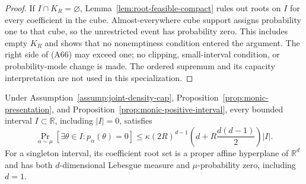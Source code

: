 \begin{proof}
If $I\cap K_R=\varnothing$, Lemma~\ref{lem:root-feasible-compact} rules out
roots on $I$ for every coefficient in the cube.  Almost-everywhere cube
support assigns probability one to that cube, so the unrestricted event has
probability zero.  This includes empty $K_R$ and shows that no nonemptiness
condition entered the argument.  The right side of \textup{(A66)} may
exceed one; no clipping, small-interval condition, or probability-mode
change is made.  The ordered supremum and its capacity interpretation are
not used in this specialization.
\end{proof}

\begin{proposition}
\label{prop:complete-monic-baseline}
Under Assumption~\ref{assump:joint-density-cap},
Proposition~\ref{prop:monic-presentation}, and
Proposition~\ref{prop:monic-positive-interval}, every bounded interval
$I\subset\mathbb R$, including $|I|=0$, satisfies
\[
\Pr_{\alpha\sim\mu}\!\left[\exists\theta\in I:p_\alpha(\theta)=0\right]
\leq\kappa(2R)^{d-1}
\left(d+R\frac{d(d-1)}2\right)|I|.
\tag{A68}
\]
For a singleton interval, its coefficient root set is a proper affine
hyperplane of $\mathbb R^d$ and has both $d$-dimensional Lebesgue measure
and $\mu$-probability zero, including $d=1$.
\end{proposition}

